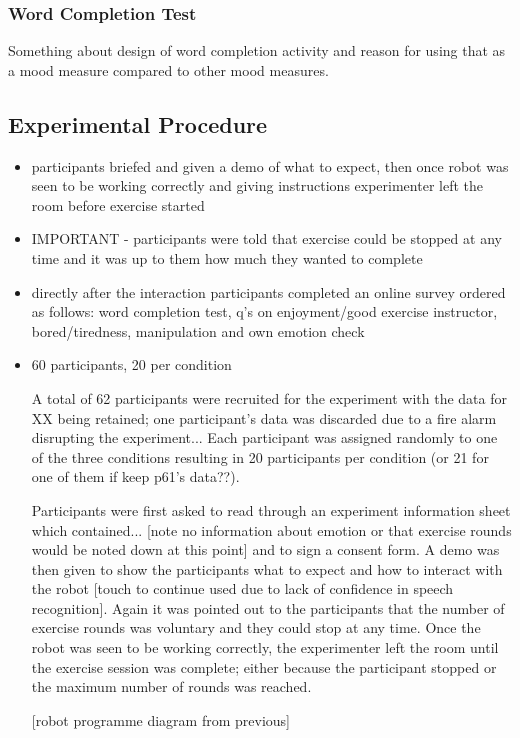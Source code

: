 \documentclass[11pt,a4paper]{report}
\begin{document}
\subsubsection{Word Completion Test}
Something about design of word completion activity and reason for using that as a mood measure compared to other mood measures. 

\subsection{Experimental Procedure}
\begin{itemize}
	\item participants briefed and given a demo of what to expect, then once robot was seen to be working correctly and giving instructions experimenter left the room before exercise started
	\item IMPORTANT - participants were told that exercise could be stopped at any time and it was up to them how much they wanted to complete
	\item directly after the interaction participants completed an online survey ordered as follows: word completion test, q's on enjoyment/good exercise instructor, bored/tiredness, manipulation and own emotion check
	\item 60 participants, 20 per condition
	
A total of 62 participants were recruited for the experiment with the data for XX being retained; one participant's data was discarded due to a fire alarm disrupting the experiment... Each participant was assigned randomly to one of the three conditions resulting in 20 participants per condition (or 21 for one of them if keep p61's data??).  

Participants were first asked to read through an experiment information sheet which contained... [note no information about emotion or that exercise rounds would be noted down at this point] and to sign a consent form. A demo was then given to show the participants what to expect and how to interact with the robot [touch to continue used due to lack of confidence in speech recognition]. Again it was pointed out to the participants that the number of exercise rounds was voluntary and they could stop at any time. Once the robot was seen to be working correctly, the experimenter left the room until the exercise session was complete; either because the participant stopped or the maximum number of rounds was reached.

[robot programme diagram from previous]


\end{itemize}
\end{document}
